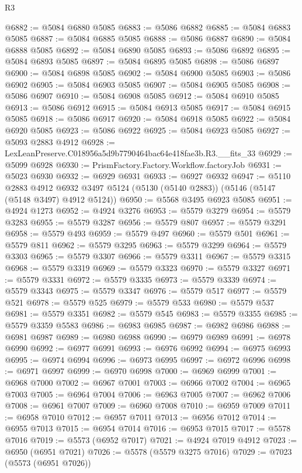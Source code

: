 \begin{lexlean}{R3}
\begin{coremodule}
@6882 := @5084 @6880 @5085
@6883 := @5086 @6882
@6885 := @5084 @6883 @5085
@6887 := @5084 @6885 @5085
@6888 := @5086 @6887
@6890 := @5084 @6888 @5085
@6892 := @5084 @6890 @5085
@6893 := @5086 @6892
@6895 := @5084 @6893 @5085
@6897 := @5084 @6895 @5085
@6898 := @5086 @6897
@6900 := @5084 @6898 @5085
@6902 := @5084 @6900 @5085
@6903 := @5086 @6902
@6905 := @5084 @6903 @5085
@6907 := @5084 @6905 @5085
@6908 := @5086 @6907
@6910 := @5084 @6908 @5085
@6912 := @5084 @6910 @5085
@6913 := @5086 @6912
@6915 := @5084 @6913 @5085
@6917 := @5084 @6915 @5085
@6918 := @5086 @6917
@6920 := @5084 @6918 @5085
@6922 := @5084 @6920 @5085
@6923 := @5086 @6922
@6925 := @5084 @6923 @5085
@6927 := @5093 @2883 @4912
@6928 := LexLeanPreserve.C018956a5d9b7790464bac64e418fae3b.R3.__fits_33
@6929 := @5099 @6928
@6930 := PrismFactory.Factory.Workflow.factoryJob
@6931 := @5023 @6930
@6932 := @6929 @6931
@6933 := @6927 @6932
@6947 := @5110
    @2883
    @4912
    @6932
    @3497
    @5124
    (@5130 (@5140 @2883))
    (@5146 (@5147 (@5148 @3497) @4912 @5124))
@6950 := @5568 @3495 @6923 @5085
@6951 := @4924 @1273
@6952 := @4924 @3276
@6953 := @5579 @3279
@6954 := @5579 @3283
@6955 := @5579 @3287
@6956 := @5579 @807
@6957 := @5579 @3291
@6958 := @5579 @493
@6959 := @5579 @497
@6960 := @5579 @501
@6961 := @5579 @811
@6962 := @5579 @3295
@6963 := @5579 @3299
@6964 := @5579 @3303
@6965 := @5579 @3307
@6966 := @5579 @3311
@6967 := @5579 @3315
@6968 := @5579 @3319
@6969 := @5579 @3323
@6970 := @5579 @3327
@6971 := @5579 @3331
@6972 := @5579 @3335
@6973 := @5579 @3339
@6974 := @5579 @3343
@6975 := @5579 @3347
@6976 := @5579 @517
@6977 := @5579 @521
@6978 := @5579 @525
@6979 := @5579 @533
@6980 := @5579 @537
@6981 := @5579 @3351
@6982 := @5579 @545
@6983 := @5579 @3355
@6985 := @5579 @3359 @5583
@6986 := @6983 @6985
@6987 := @6982 @6986
@6988 := @6981 @6987
@6989 := @6980 @6988
@6990 := @6979 @6989
@6991 := @6978 @6990
@6992 := @6977 @6991
@6993 := @6976 @6992
@6994 := @6975 @6993
@6995 := @6974 @6994
@6996 := @6973 @6995
@6997 := @6972 @6996
@6998 := @6971 @6997
@6999 := @6970 @6998
@7000 := @6969 @6999
@7001 := @6968 @7000
@7002 := @6967 @7001
@7003 := @6966 @7002
@7004 := @6965 @7003
@7005 := @6964 @7004
@7006 := @6963 @7005
@7007 := @6962 @7006
@7008 := @6961 @7007
@7009 := @6960 @7008
@7010 := @6959 @7009
@7011 := @6958 @7010
@7012 := @6957 @7011
@7013 := @6956 @7012
@7014 := @6955 @7013
@7015 := @6954 @7014
@7016 := @6953 @7015
@7017 := @5578 @7016
@7019 := @5573 (@6952 @7017)
@7021 := @4924 @7019 @4912
@7023 := @6950 (@6951 @7021)
@7026 := @5578 (@5579 @3275 @7016)
@7029 := @7023 (@5573 (@6951 @7026))

\end{coremodule}
\end{lexlean}
